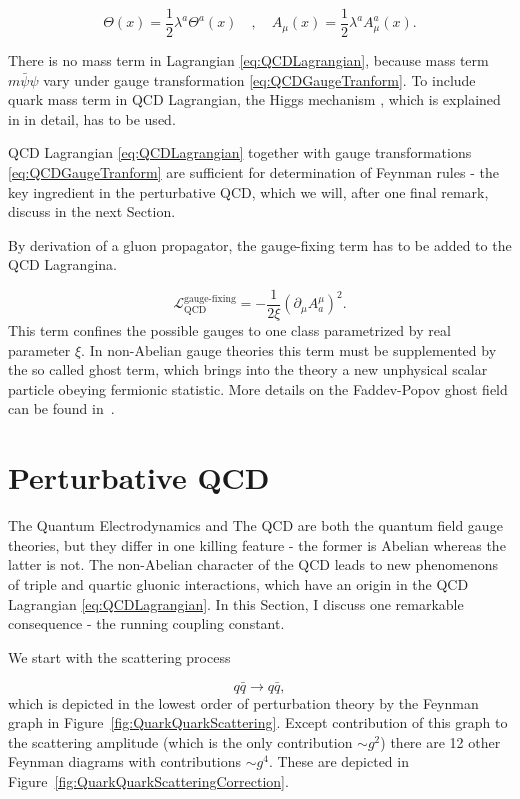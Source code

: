 \begin{equation}
  \Theta(x) = \frac{1}{2} \lambda^a \Theta^a(x) 
  \quad , \quad
  A_\mu(x) = \frac{1}{2} \lambda^a A_\mu^a(x).
  \label{eq:QCDAdditionalFunctions}
\end{equation}

There is no mass term in Lagrangian \eqref{eq:QCDLagrangian}, because mass term
$m\bar{\psi}\psi$ vary under gauge transformation
\eqref{eq:QCDGaugeTranform}. To include quark mass term in QCD Lagrangian, the
Higgs mechanism \cite{HiggsMechanism}, which is explained in
\cite{horejsi2002fundamentals} in detail, has to be used.

QCD Lagrangian \eqref{eq:QCDLagrangian} together with gauge transformations
\eqref{eq:QCDGaugeTranform} are sufficient for determination of Feynman rules -
the key ingredient in the perturbative QCD, which we will, after one final
remark, discuss in the next Section.

By derivation of a gluon propagator, the gauge-fixing term has to be added to
the QCD Lagrangina.

\begin{equation}
  \mathscr{L}_{\text{QCD}}^{\text{gauge-fixing}} = - \frac{1}{2\xi} \left( \partial_\mu A_a^\mu
  \right)^2.
  \label{eq:QCDGaugeFixingTerm}
\end{equation}
This term confines the possible gauges to one class parametrized by real parameter
$\xi$. In non-Abelian gauge theories this term must be supplemented by the so
called ghost term, which brings into the theory a new unphysical scalar particle
obeying fermionic statistic. More details on the Faddev-Popov ghost field
can be found in~\cite{FaddeevPopovGhosts}.


\section{Perturbative QCD}

The Quantum Electrodynamics and The QCD are both the quantum field gauge theories, but
they differ in one killing feature - the former is Abelian whereas the latter is
not. The non-Abelian character of the QCD leads to new phenomenons of triple and
quartic gluonic interactions, which have an origin in the QCD Lagrangian
\eqref{eq:QCDLagrangian}. 
In this Section, I discuss one remarkable consequence - the running coupling
constant.

We start with the scattering process

\begin{equation}
  q \bar{q} \rightarrow q \bar{q},
  \label{eq:QuarkScattering}
\end{equation}
which is depicted in the lowest order of perturbation theory by the Feynman
graph in Figure~\ref{fig:QuarkQuarkScattering}. Except contribution of this
graph to the scattering amplitude (which is the only contribution $\sim g^2$)
there are 12 other Feynman diagrams with contributions $\sim g^4$. These are
depicted in Figure~\ref{fig:QuarkQuarkScatteringCorrection}. 

